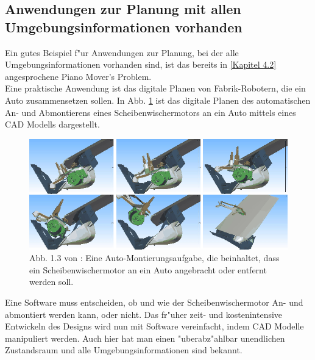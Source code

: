 \subsection{Anwendungen zur Planung mit allen Umgebungsinformationen vorhanden}
Ein gutes Beispiel f"ur Anwendungen zur Planung, bei der alle Umgebungsinformationen vorhanden sind, ist das bereits in \ref{Kapitel 4.2} angesprochene Piano Mover's Problem.\\
Eine praktische Anwendung ist das digitale Planen von Fabrik-Robotern, die ein Auto zusammensetzen sollen. In Abb. \ref{Abb. 5.2} ist das digitale Planen des automatischen An- und Abmontierens eines Scheibenwischermotors an ein Auto mittels eines CAD Modells dargestellt.
\begin{figure}
	\centering
	\includegraphics[width=0.7\linewidth]{images/img231}
	\caption{Abb. 1.3 von \cite[~S. 7]{Lav06}: Eine Auto-Montierungsaufgabe, die beinhaltet, dass ein Scheibenwischermotor an ein Auto angebracht oder entfernt werden soll.}
	\label{Abb. 5.2}
\end{figure}

Eine Software muss entscheiden, ob und wie der Scheibenwischermotor An- und abmontiert werden kann, oder nicht. Das fr"uher zeit- und kostenintensive Entwickeln des Designs wird nun mit Software vereinfacht, indem CAD Modelle manipuliert werden. Auch hier hat man einen "uberabz"ahlbar unendlichen Zustandsraum und alle Umgebungsinformationen sind bekannt. \cite[~S. 6 ff]{Lav06}
